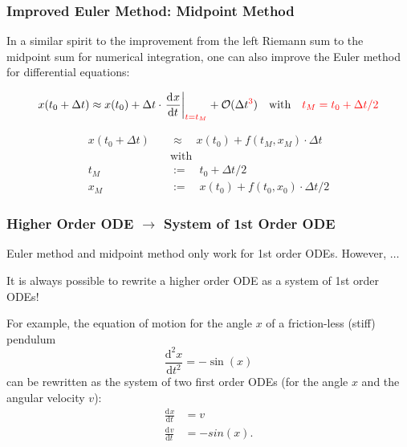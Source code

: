 \documentclass[11pt,aspectratio=169,handout]{beamer}
\newcommand{\dif}[3][]{\frac{\mathrm{d}^{#1}#3}{\mathrm{d}{#2}^{#1}}}
\newcommand{\eval}[2]{\left. #1 \right\vert_{#2}}
\begin{document}
\begin{frame}
\frametitle{Improved Euler Method: Midpoint Method}
In a similar spirit to the improvement from the left Riemann sum to the midpoint sum for numerical integration, one can also improve the Euler method for differential equations:

$$x(t_0 + \Delta t) \approx x(t_0) + \Delta t \cdot \eval{\dif{t}{x}}{{\color{red}t=t_M}} + \mathcal{O}(\Delta t^{\color{red}3}) \quad \text{with} \quad {\color{red}t_M=t_0 + \Delta t/2}$$

\pause

\begin{block}{\vspace*{-3ex}}
\begin{align*}
x(t_0+\Delta t) \quad &\approx \quad x(t_0) + f(t_M, x_M) \cdot \Delta t \\
 & \text{with} \\
t_M \quad &:= \quad t_0+\Delta t/2 \\
x_M \quad &:= \quad x(t_0) +  f(t_0, x_0)\cdot \Delta t/2
\end{align*}
\end{block}
\end{frame}

\begin{frame}
\frametitle{Higher Order ODE $\rightarrow$ System of 1st Order ODE}
Euler method and midpoint method only work for 1st order ODEs. However, $\ldots$
\pause
\begin{block}{\vspace*{-3ex}}
	It is always possible to rewrite a higher order ODE as a system of 1st order ODEs!
\end{block}
\pause
For example, the equation of motion for the angle $x$ of a friction-less (stiff) pendulum
$$\dif[2]{t}{x} = -\sin(x)$$
can be rewritten as the system of two first order ODEs (for the angle $x$ and the angular velocity $v$):
\begin{align*}
	\dif{t}{x} &= v \\
	\dif{t}{v} &= -sin(x) \mathrm{.}
\end{align*} 
\end{frame}
\end{document}
